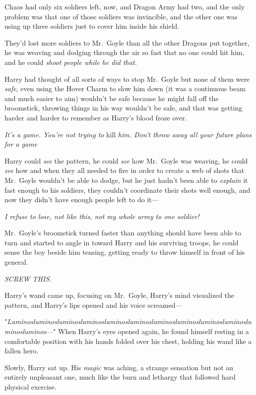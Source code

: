 Chaos had only six soldiers left, now, and Dragon Army had two, and the only
problem was that one of those soldiers was invincible, and the other one was
using up three soldiers just to cover him inside his shield.

They'd lost more soldiers to Mr.~Goyle than all the other Dragons put together,
he was weaving and dodging through the air so fast that no one could hit him,
and he could \emph{shoot people while he did that.}

Harry had thought of all sorts of ways to stop Mr.~Goyle but none of them were
\emph{safe}, even using the Hover Charm to slow him down (it was a continuous
beam and much easier to aim) wouldn't be safe because he might fall off the
broomstick, throwing things in his way wouldn't be safe, and that was getting
harder and harder to remember as Harry's blood froze over.

\emph{It's a game. You're not trying to} kill \emph{him. Don't throw away all
your future plans for a game{\el}}

Harry could \emph{see} the pattern, he could \emph{see} how Mr.~Goyle was
weaving, he could \emph{see} how and when they all needed to fire in order to
create a web of shots that Mr.~Goyle wouldn't be able to dodge, but he just
hadn't been able to \emph{explain} it fast enough to his soldiers, they
couldn't coordinate their shots well enough, and now they didn't have enough
people left to do it---

\emph{I refuse to lose, not like this, not my whole army to one soldier!}

Mr.~Goyle's broomstick turned faster than anything should have been able to
turn and started to angle in toward Harry and his surviving troops, he could
sense the boy beside him tensing, getting ready to throw himself in front of
his general.

\emph{SCREW THIS.}

Harry's wand came up, focusing on Mr.~Goyle, Harry's mind visualized the
pattern, and Harry's lips opened and his voice screamed---

"\emph{Lu\-min\-os\-lu\-min\-os\-lu\-min\-os\-lu\-min\-os\-lu\-min\-os\-lu\-min\-os\-lu\-min\-os\-lu\-min\-os\-lu\-min\-os\-lu\-min\-os\-lu\-min\-os\-lu\-min\-os}\mbox{---}"
\sbreak
When Harry's eyes opened again, he found himself resting in a comfortable
position with his hands folded over his chest, holding his wand like a fallen
hero.

Slowly, Harry sat up. His \emph{magic} was aching, a strange sensation but not
an entirely unpleasant one, much like the burn and lethargy that followed hard
physical exercise.

